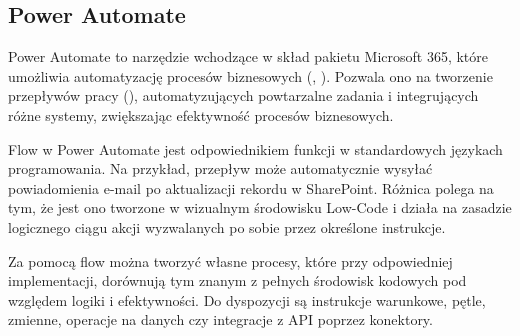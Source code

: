 \subsection{Power Automate}
Power Automate to narzędzie wchodzące w skład pakietu Microsoft 365, które umożliwia automatyzację procesów biznesowych (, ). Pozwala ono na tworzenie przepływów pracy (), automatyzujących powtarzalne zadania i integrujących różne systemy, zwiększając efektywność procesów biznesowych.

Flow w Power Automate jest odpowiednikiem funkcji w standardowych językach programowania. Na przykład, przepływ może automatycznie wysyłać powiadomienia e-mail po aktualizacji rekordu w SharePoint. Różnica polega na tym, że jest ono tworzone w wizualnym środowisku Low-Code i działa na zasadzie logicznego ciągu akcji wyzwalanych po sobie przez określone instrukcje.

Za pomocą flow można tworzyć własne procesy, które przy odpowiedniej implementacji, dorównują tym znanym z pełnych środowisk kodowych pod względem logiki i efektywności. Do dyspozycji są instrukcje warunkowe, pętle, zmienne, operacje na danych czy integracje z API poprzez konektory.
